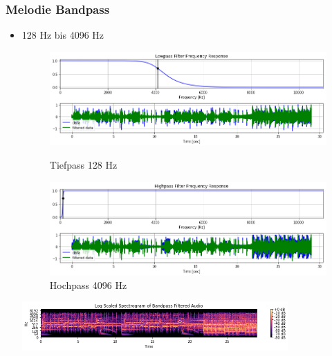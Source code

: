 \documentclass[12pt]{FSUBeamer_official}
\begin{document}
\begin{frame}
	\frametitle{Melodie Bandpass}
	\begin{itemize}
		\item 128 Hz bis 4096 Hz
		\begin{figure}[ht]
			\begin{minipage}[b]{0.46\linewidth}
				\centering
				\includegraphics[width=\textwidth]{pics/Chroma/sialp.png}
				\caption{Tiefpass 128 Hz}
				\label{lp}
			\end{minipage}
			\hspace{0.1cm}
			\begin{minipage}[b]{0.46\linewidth}
				\centering
				\includegraphics[width=\textwidth]{pics/Chroma/siahp.png}
				\caption{Hochpass 4096 Hz}
				\label{hp}
			\end{minipage}
			\hspace{0.1cm}
		\end{figure}	
		\includegraphics[width=0.8\textwidth]{pics/Chroma/siafft.png}
	\end{itemize}
\end{frame}
\end{document}
